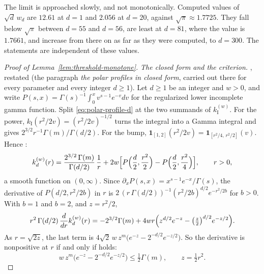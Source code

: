 The limit is approached slowly, and not monotonically. Computed values of $\sqrt d\,w_d$ are
$12.61$ at $d = 1$ and $2.056$ at $d = 20$, against $\sqrt\pi \approx 1.7725$. They fall below
$\sqrt\pi$ between $d = 55$ and $d = 56$, are least at $d = 81$, where the value is $1.7661$, and
increase from there on as far as they were computed, to $d = 300$. The statements are
independent of these values.

\begin{proof}[Proof of Lemma~\ref{lem:threshold-monotone}]
\emph{The closed form and the criterion.} , restated (the paragraph \emph{the polar
profiles in closed form}, carried out there for every parameter and every integer $d \ge 1$). Let
$d \ge 1$ be an integer and $w > 0$, and write
$P(s,x) = \Gamma(s)^{-1}\int_0^x v^{s-1}e^{-v}dv$ for the regularized lower incomplete gamma
function. Split \ref{eq:polar-profile-d} at the two summands of $k^{(w)}_{\mathrm I}$. For the
power, $k_{\mathrm I}(r^2/2v) = (r^2/2v)^{-1/2}$ turns the integral into a Gamma integral and
gives $2^{3/2}r^{-1}\Gamma(m)/\Gamma(d/2)$. For the bump,
$\mathbf{1}_{[1,2]}(r^2/2v) = \mathbf{1}_{[r^2/4,\,r^2/2]}(v)$. Hence :
\begin{equation}\label{eq:witness-polar}
  k^{(w)}_d(r) = \frac{2^{3/2}\,\Gamma(m)}{\Gamma(d/2)}\,\frac1r
   + 2w\Bigl[P\Bigl(\frac d2,\frac{r^2}2\Bigr) - P\Bigl(\frac d2,\frac{r^2}4\Bigr)\Bigr],
   \qquad r > 0 ,
\end{equation}
a smooth function on $(0,\infty)$. Since $\partial_x P(s,x) = x^{s-1}e^{-x}/\Gamma(s)$, the
derivative of $P(d/2, r^2/2b)$ in $r$ is $2\,(r\,\Gamma(d/2))^{-1}(r^2/2b)^{d/2}e^{-r^2/2b}$ for
$b > 0$. With $b = 1$ and $b = 2$, and $z = r^2/2$,
\[
  r^2\,\Gamma(d/2)\,\frac{d}{dr}k^{(w)}_d(r)
   = -2^{3/2}\Gamma(m) + 4wr\Bigl(z^{d/2}e^{-z} - \bigl(\tfrac z2\bigr)^{d/2}e^{-z/2}\Bigr) .
\]
As $r = \sqrt{2z}$, the last term is $4\sqrt2\,w\,z^m\bigl(e^{-z} - 2^{-d/2}e^{-z/2}\bigr)$. So the
derivative is nonpositive at $r$ if and only if  holds:
\begin{equation}\label{eq:threshold-criterion}
  w\,z^m\bigl(e^{-z} - 2^{-d/2}e^{-z/2}\bigr) \le \tfrac12\Gamma(m),
  \qquad z = \tfrac12 r^2 .
\end{equation}


\end{proof}
